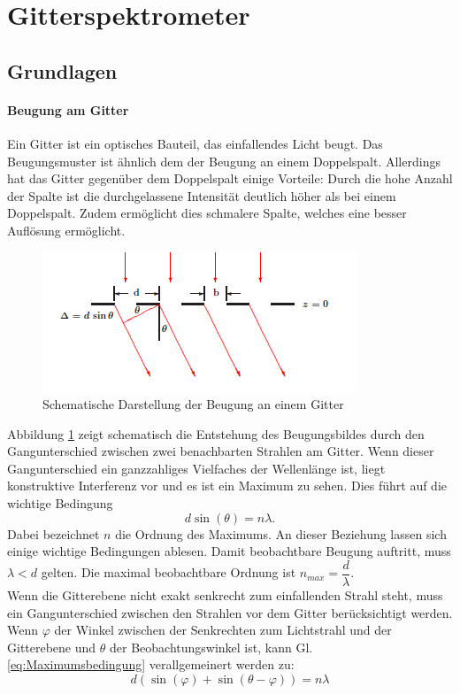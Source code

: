 \documentclass[12pt,a4paper]{article}
\begin{document}
\newpage
\section{Gitterspektrometer}

\subsection{Grundlagen}
\paragraph{Beugung am Gitter}
Ein Gitter ist ein optisches Bauteil, das einfallendes Licht beugt. Das Beugungsmuster ist ähnlich dem der Beugung an einem Doppelspalt. Allerdings hat das Gitter gegenüber dem Doppelspalt einige Vorteile: Durch die hohe Anzahl der Spalte ist die durchgelassene Intensität deutlich höher als bei einem Doppelspalt. Zudem ermöglicht dies schmalere Spalte, welches eine besser Auflösung ermöglicht.\\
	\begin{figure}
		\begin{center}
			\includegraphics[scale=1.2]{Bilder/Gitterbeugung_Schema.PNG}
		\end{center}
		\caption[Gitterbeugung Schema]{Schematische Darstellung der Beugung an einem Gitter}
		\label{fig:Gitterbeugung_Schema}
	\end{figure}
	Abbildung \ref{fig:Gitterbeugung_Schema} zeigt schematisch die Entstehung des Beugungsbildes durch den Gangunterschied zwischen zwei benachbarten Strahlen am Gitter. Wenn dieser Gangunterschied ein ganzzahliges Vielfaches der Wellenlänge ist, liegt konstruktive Interferenz vor und es ist ein Maximum zu sehen. Dies führt auf die wichtige Bedingung
	\begin{equation}
	d \sin (\theta) = n \lambda.
	\label{eq:Maximumsbedingung}
	\end{equation}
	Dabei bezeichnet $n$ die Ordnung des Maximums. An dieser Beziehung lassen sich einige wichtige Bedingungen ablesen. Damit beobachtbare Beugung auftritt, muss $\lambda < d$ gelten. Die maximal beobachtbare Ordnung ist $n_{max} = \dfrac{d}{\lambda}$. \\
	Wenn die Gitterebene nicht exakt senkrecht zum einfallenden Strahl steht, muss ein Gangunterschied zwischen den Strahlen vor dem Gitter berücksichtigt werden. Wenn $\varphi$ der Winkel zwischen der Senkrechten zum Lichtstrahl und der Gitterebene und $\theta$ der Beobachtungswinkel ist, kann Gl. \ref{eq:Maximumsbedingung} verallgemeinert werden zu:
	\begin{equation}
	d(\sin(\varphi) + \sin(\theta - \varphi)) = n \lambda
	\label{eq:VerallgemeinerteMaximumsbedingung}
	\end{equation}
	
\end{document}
